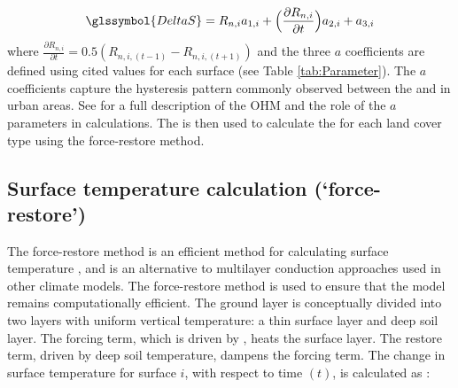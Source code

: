 \documentclass[final,3p,times,authoryear]{elsarticle}
\begin{document}
\begin{equation} 
\glssymbol{DeltaS} = R_{n,i} a_{1,i} + \Big( \frac{\partial R_{n,i}}{\partial t}   \Big) a_{2,i} + a_{3,i}
\label{eq:ohm} \end{equation} where  $\frac{\partial R_{n,i}}{\partial t} =0.5(R_{n,i,(t-1)} - R_{n,i,(t+1)})$ and the three $a$ coefficients  are defined using cited values for each surface (see Table \ref{tab:Parameter}). The $a$ coefficients capture the hysteresis pattern commonly observed between the  and  in urban areas. See \cite{Grimmond1999b} for a full description of the OHM and the role of the $a$ parameters in  calculations. The   is then used to calculate the  for each land cover type using the force-restore method.







\subsection{Surface temperature calculation (`force-restore')}\label{sec:tsurf}

The force-restore method is an efficient method for calculating surface temperature \citep{bhumralkar1975,deardorff1978}, and is an alternative to multilayer conduction approaches used in other climate models. The force-restore method is used to ensure that the model remains computationally efficient.  The ground layer is conceptually divided into two layers with uniform vertical temperature: a thin surface layer and deep soil layer. The forcing term, which is driven by  , heats the surface layer. The restore term, driven by deep soil temperature, dampens the forcing term. The change in surface temperature  for surface $i$, with respect to time $(t)$, is calculated as \citep{jacobs2000}:
\end{document}
